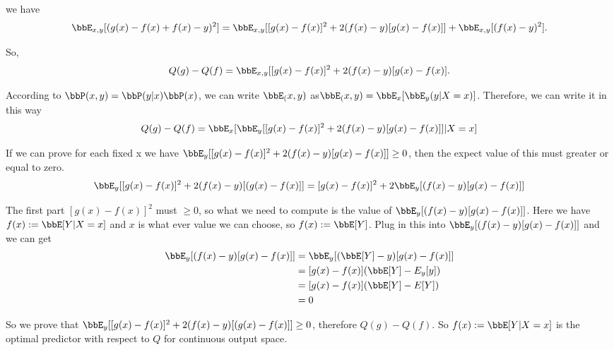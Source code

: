 \documentclass[twoside,11pt]{homework}
\begin{document}
we have
\[
\bbE_{x,y} [(g(x)-f(x)+f(x)-y)^2]=\bbE_{x,y} [[g(x)-f(x)]^2+2(f(x)-y)[g(x)-f(x)]]
  +\bbE_{x,y}[(f(x)-y)^2].
\]

So, 
\begin{equation}
  Q(g)-Q(f)=\bbE_{x,y} [[g(x)-f(x)]^2+2(f(x)-y)[g(x)-f(x)].
\end{equation}

According to $\bbP(x,y) =\bbP(y|x)\bbP(x)$, we can write $\bbE_(x,y)$ as$\bbE_(x,y)=\bbE_x[\bbE_y(y|X=x)]$. 
Therefore, we can write it in this way
\begin{equation}
  Q(g)-Q(f)=\bbE_x[\bbE_y [[g(x)-f(x)]^2+2(f(x)-y)[g(x)-f(x)]]|X=x]
\end{equation}

If we can prove for each fixed x we have $\bbE_y [[g(x)-f(x)]^2+2(f(x)-y)[g(x)-f(x)]] \ge 0$, then the expect value of this must greater or equal to zero.
\[
  \bbE_y [[g(x)-f(x)]^2+2(f(x)-y)[(g(x)-f(x)]]=[g(x)-f(x)]^2+2\bbE_y[(f(x)-y)[g(x)-f(x)]]
\]

The first part $[g(x)-f(x)]^2$ must $\ge 0$, so what we need to compute is the value of $\bbE_y[(f(x)-y)[g(x)-f(x)]]$. Here we have $f(x):=\bbE [Y|X=x]$ and $x$ is what ever value we can choose, so $f(x):=\bbE [Y]$. Plug in this into $\bbE_y[(f(x)-y)[g(x)-f(x)]]$ and we can get
\begin{align}
\notag  \bbE_y[(f(x)-y)[g(x)-f(x)]]&=\bbE_y[(\bbE [Y]-y)[g(x)-f(x)]]
\\
\notag  &=[g(x)-f(x)](\bbE [Y]-E_y[y])
\\
\notag  &=[g(x)-f(x)](\bbE [Y]-E[Y])
\\
\notag  &=0
\end{align}

So we prove that $\bbE_y [[g(x)-f(x)]^2+2(f(x)-y)[(g(x)-f(x)]] \ge 0$, therefore $Q(g)-Q(f)$. So $f(x):=\bbE [Y|X=x]$ is the optimal predictor with respect to $Q$ for continuous output space.
\end{document}
